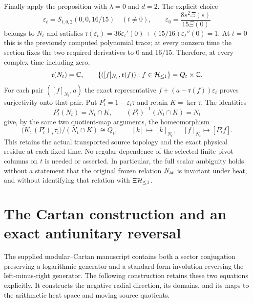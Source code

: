 Finally apply the proposition with $\lambda=0$ and $d=2$.
The explicit choice
\begin{equation}
 \varepsilon_t=\mathcal S_{t,0,2}(0,0,16/15)\quad(t\ne0),
 \qquad \varepsilon_0=\frac{8s^2\Xi(s)}{15\Xi(0)}
 \label{eq:cq-moving-residue-section}
\end{equation}
belongs to $N_t$ and satisfies
$\mathfrak r(\varepsilon_t)
 =36\varepsilon_t'(0)+(15/16)\varepsilon_t''(0)=1$.
At $t=0$ this is the previously computed polynomial trace;
at every nonzero time the section fixes the two required
derivatives to $0$ and $16/15$. Therefore, at every complex
time including zero,
\begin{equation}
 \mathfrak r(N_t)=\mathbb C,\qquad
 \{([f]_{N_t},\mathfrak r(f)):f\in\mathcal H_{\leq 1}\}
      =Q_t\times\mathbb C.
 \label{eq:cq-all-times-residue-ambiguity}
\end{equation}
For each pair $([f]_{N_t},a)$ the exact representative
$f+(a-\mathfrak r(f))\varepsilon_t$ proves surjectivity onto that
pair. Put $P_t^{\mathfrak r}=1-\varepsilon_t\mathfrak r$ and
retain $K=\ker\mathfrak r$. The identities
\[
 P_t^{\mathfrak r}(N_t)=N_t\cap K,
 \qquad (P_t^{\mathfrak r})^{-1}(N_t\cap K)=N_t
\]
give, by the same two quotient-map arguments, the homeomorphism
\begin{equation}
 \bigl(K,(P_t^{\mathfrak r})_*\tau_t\bigr)/(N_t\cap K)
      \cong Q_t,
 \qquad [k]\mapsto[k]_{N_t},\quad
 [f]_{N_t}\mapsto[P_t^{\mathfrak r}f].
 \label{eq:cq-all-times-residue-source-quotient}
\end{equation}
This retains the actual transported source topology and
the exact physical residue at each fixed time. No
regular dependence of the selected finite pivot columns
on $t$ is needed or asserted. In particular, the full
scalar ambiguity holds without a statement that the
original frozen relation $N_{\rm ar}$ is invariant under heat,
and without identifying that relation with $\Xi\mathcal H_{\leq 1}$.

\section{The Cartan construction and an exact antiunitary reversal}
\label{sec:cq-cartan-heat}

The supplied modular--Cartan manuscript \cite{cqCartan} contains both
a sector conjugation preserving a logarithmic generator and a
standard-form involution reversing the left-minus-right generator.
The following construction retains these two equations explicitly.
It constructs the negative radial direction, its domains, and its
maps to the arithmetic heat space and moving source quotients.

